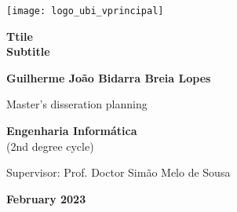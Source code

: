\begin{titlepage}
\begin{center}

\begin{flushright}
 \texttt{[image: logo\_ubi\_vprincipal]}\\


\vspace{7.6cm}

\rostotitulo \textbf{Ttile} \\
\rostosubtit \textbf{Subtitle}\\

\vspace{1.8cm}

\rostonomes \textbf{Guilherme João Bidarra Breia Lopes}\\

\vspace{1.4cm}


\rostooutros Master's disseration planning

\rostonomes \textbf{Engenharia Informática}\\
\rostooutros (2nd degree cycle)\\

\vspace{3.3cm}

\rostooutros Supervisor: Prof. Doctor Simão Melo de Sousa\\

\vspace{1.4cm}

\rostooutros \textbf{February 2023}

\end{flushright}

\end{center}
\end{titlepage}

